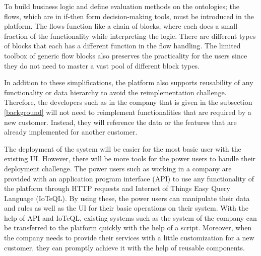 To build business logic and define evaluation methods on the ontologies; the flows, which are in if-then form decision-making tools, must be introduced in the platform. The flows function like a chain of blocks, where each does a small fraction of the functionality while interpreting the logic.  There are different types of blocks that each has a different function in the flow handling. The limited toolbox of generic flow blocks also preserves the practicality for the users since they do not need to master a vast pool of different block types.

In addition to these simplifications, the platform also supports reusability of any functionality or data hierarchy to avoid the reimplementation challenge. Therefore, the developers such as in the company that is given in the subsection \ref{background} will not need to reimplement functionalities that are required by a new customer. Instead, they will reference the data or the features that are already implemented for another customer.


The deployment of the system will be easier for the most basic user with the existing UI. However, there will be more tools for the power users to handle their deployment challenge. The power users such as working in a company are provided with an application program interface (API) to use any functionality of the platform through HTTP requests and Internet of Things Easy Query Language (IoTeQL). By using these, the power users can manipulate their data and rules as well as the UI for their basic operations on their system. With the help of API and IoTeQL, existing systems such as the system of the company can be transferred to the platform quickly with the help of a script. Moreover, when the company needs to provide their services with a little customization for a new customer, they can promptly achieve it with the help of reusable components.

